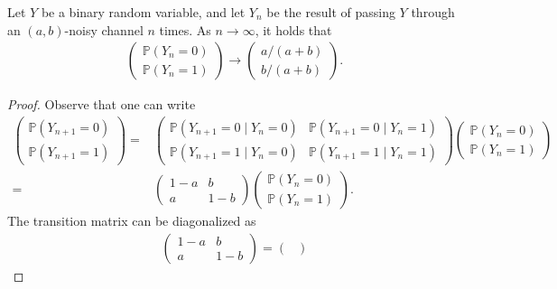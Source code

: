 \documentclass[10pt,a4paper]{amsart}
\renewcommand{\P}{\mathbb P}
\begin{document}
\begin{lemma}\label{lem: limitingdist}
    Let $Y$ be a binary random variable, and let $Y_n$ be the result of passing $Y$ through an $(a,b)$-noisy channel $n$ times. As $n\to\infty$, it holds that
    \begin{align}
    \begin{pmatrix}
        \P(Y_n=0)\\
        \P(Y_n=1)
    \end{pmatrix}
        \to
        \begin{pmatrix}
            a/(a+b)\\
            b/(a+b)
        \end{pmatrix}.
    \end{align}
\end{lemma}

\begin{proof}
    Observe that one can write
    \begin{align}
        \begin{pmatrix}
            \P(Y_{n+1}=0)\\
            \P(Y_{n+1}=1)
        \end{pmatrix}
        =&\begin{pmatrix}
            \P(Y_{n+1}=0\mid Y_{n}=0) & \P(Y_{n+1}=0\mid Y_{n}=1)\\
            \P(Y_{n+1}=1\mid Y_{n}=0) & \P(Y_{n+1}=1\mid Y_{n}=1)
        \end{pmatrix}
        \begin{pmatrix}
            \P(Y_{n}=0)\\
            \P(Y_{n}=1)
        \end{pmatrix}\\
        =&\begin{pmatrix}
            1-a & b\\
            a & 1-b
        \end{pmatrix}
        \begin{pmatrix}
            \P(Y_{n}=0)\\
            \P(Y_{n}=1)
        \end{pmatrix}.
    \end{align}
The transition matrix can be diagonalized as
\begin{align}
    \begin{pmatrix}
            1-a & b\\
            a & 1-b
        \end{pmatrix}
        =\begin{pmatrix}

\end{pmatrix}
\end{align}
\end{proof}
\end{document}
